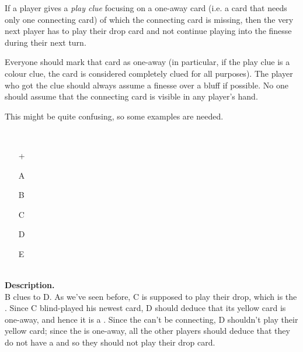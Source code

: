 \begin{convention}[Bluff]
	\label{bluff}
	If a player gives a \emph{play clue} focusing on a one-away card (i.e. a card that needs only one connecting card) of which the connecting card is missing, then the very next player has to play their drop card and not continue playing into the finesse during their next turn.
	
	Everyone should mark that card as one-away (in particular, if the play clue is a colour clue, the card is considered completely clued for all purposes). The player who got the clue should always assume a finesse over a bluff if possible. No one should assume that the connecting card is visible in any player's hand.
\end{convention}

This might be quite confusing, so some examples are needed.

\begin{example}
	\label{ex:bluff}
	\hfill \\
	\begin{minipage}{0.45\textwidth}
		\begin{itemize}
			\item[\Large +]      
			\item[\Large A]    
			\item[\Large B]    
			\item[\Large C]    
			\item[\Large D]    
			\item[\Large E]    
		\end{itemize}
	\end{minipage}%
	\begin{minipage}{0.55\textwidth}
		\hfill \\
		
		\textbf{Description.} \\
		
		B clues  to D. As we've seen before, C is supposed to play their drop, which is the . Since C blind-played his newest card, D should deduce that its yellow card is one-away, and hence it is a . Since the  can't be connecting, D shouldn't play their yellow card; since the  is one-away, all the other players should deduce that they do not have a  and so they should not play their drop card.
	\end{minipage}
\end{example} \vspace{0.15 cm}

